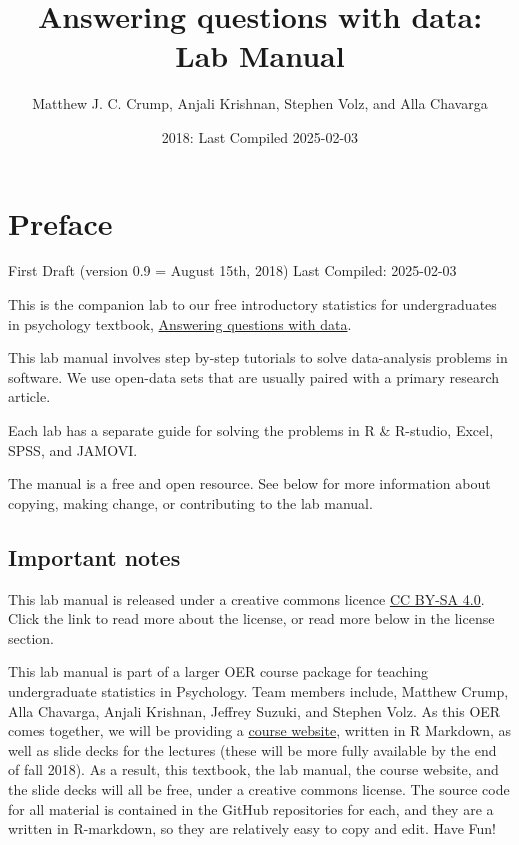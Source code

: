 \documentclass[
]{book}
\title{Answering questions with data: Lab Manual}
\author{Matthew J. C. Crump, Anjali Krishnan, Stephen Volz, and Alla Chavarga}
\date{2018: Last Compiled 2025-02-03}
\begin{document}
\maketitle

{
\setcounter{tocdepth}{1}
\tableofcontents
}
\hypertarget{preface}{%
\chapter*{Preface}\label{preface}}

First Draft (version 0.9 = August 15th, 2018)
Last Compiled: 2025-02-03

This is the companion lab to our free introductory statistics for undergraduates in psychology textbook, \href{https://crumplab.github.io/statistics/}{Answering questions with data}.

This lab manual involves step by-step tutorials to solve data-analysis problems in software. We use open-data sets that are usually paired with a primary research article.

Each lab has a separate guide for solving the problems in R \& R-studio, Excel, SPSS, and JAMOVI.

The manual is a free and open resource. See below for more information about copying, making change, or contributing to the lab manual.

\hypertarget{important-notes}{%
\section{Important notes}\label{important-notes}}

This lab manual is released under a creative commons licence \href{https://creativecommons.org/licenses/by-sa/4.0/}{CC BY-SA 4.0}. Click the link to read more about the license, or read more below in the license section.

This lab manual is part of a larger OER course package for teaching undergraduate statistics in Psychology. Team members include, Matthew Crump, Alla Chavarga, Anjali Krishnan, Jeffrey Suzuki, and Stephen Volz. As this OER comes together, we will be providing a \href{https://crumplab.github.io/psyc3400/}{course website}, written in R Markdown, as well as slide decks for the lectures (these will be more fully available by the end of fall 2018). As a result, this textbook, the lab manual, the course website, and the slide decks will all be free, under a creative commons license. The source code for all material is contained in the GitHub repositories for each, and they are a written in R-markdown, so they are relatively easy to copy and edit. Have Fun!
\end{document}
